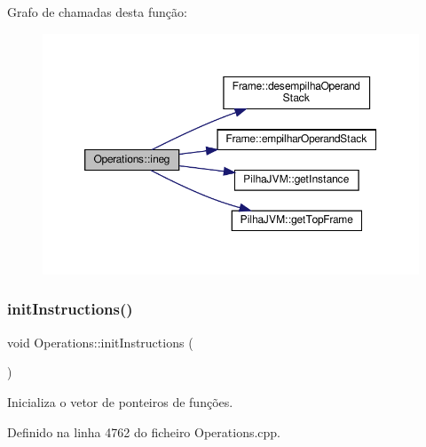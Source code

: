 Grafo de chamadas desta função\+:
\nopagebreak
\begin{figure}[H]
\begin{center}
\leavevmode
\includegraphics[width=350pt]{classOperations_a819d5dd66c64a6801a1599b5abf81ae7_cgraph}
\end{center}
\end{figure}
\mbox{\label{classOperations_ae0d60fc4bf4279ae24bdb47cb3634045}} 
\subsubsection{\texorpdfstring{init\+Instructions()}{initInstructions()}}
{\footnotesize\ttfamily void Operations\+::init\+Instructions (\begin{DoxyParamCaption}{ }\end{DoxyParamCaption})\hspace{0.3cm}{\ttfamily [private]}}



Inicializa o vetor de ponteiros de funções. 



Definido na linha 4762 do ficheiro Operations.\+cpp.



